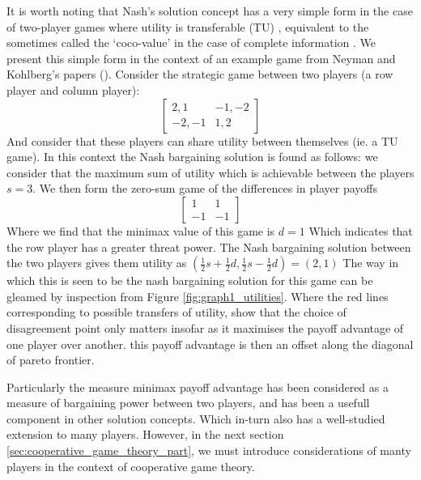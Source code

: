 It is worth noting that Nash's solution concept has a very simple form in the case of two-player games where utility is transferable (TU) \cite{value2,shap_lectures,value1}, equivalent to the sometimes called the `coco-value' in the case of complete information \cite{kalai1,Kalai2010}.
We present this simple form in the context of an example game from Neyman and Kohlberg's papers (\cite{value2,value1}).
Consider the strategic game between two players (a row player and column player):
\begin{equation}\label{eq:example_game1} \begin{bmatrix}2,1 & -1,-2\\ -2,-1 & 1,2\end{bmatrix} \end{equation}
And consider that these players can share utility between themselves (ie. a TU game). In this context the Nash bargaining solution is found as follows:
we consider that the maximum sum of utility which is achievable between the players $s=3$.
We then form the zero-sum game of the differences in player payoffs
$$ \begin{bmatrix}1 & 1\\ -1 & -1\end{bmatrix} $$
Where we find that the minimax value of this game is $d=1$ Which indicates that the row player has a greater threat power.
The Nash bargaining solution between the two players gives them utility as $(\frac{1}{2}s+\frac{1}{2}d,\frac{1}{2}s-\frac{1}{2}d) = (2,1)$
The way in which this is seen to be the nash bargaining solution for this game can be gleamed by inspection from Figure \ref{fig:graph1_utilities}.
Where the red lines corresponding to possible transfers of utility, show that the choice of disagreement point only matters insofar as it maximises the payoff advantage of one player over another.
this payoff advantage is then an offset along the diagonal of pareto frontier.

Particularly the measure minimax payoff advantage has been considered as a measure of bargaining power between two players, and has been a usefull component in other solution concepts.
Which in-turn also has a well-studied extension to many players.\cite{values1,values2,values3}
However, in the next section \ref{sec:cooperative_game_theory_part}, we must introduce considerations of manty players in the context of cooperative game theory.


